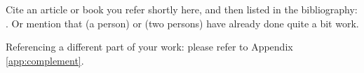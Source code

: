 Cite an article or book you refer shortly here, and then listed in the bibliography: \cite{ReferenceKey}. 
Or mention that \citeauthor{HamF85} (a person) or \citeauthor{StaWW91} (two
persons) have already done quite a bit work.

Referencing a different part of your work: please refer to Appendix \ref{app:complement}.


